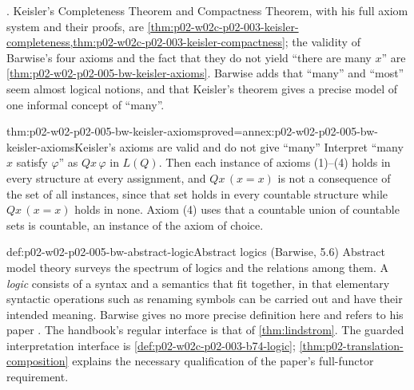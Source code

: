 \cite[ch.~A.1, \S5, pp.~44--45]{Barwise1977FirstOrder}.  Keisler's Completeness Theorem and Compactness Theorem, with his full
axiom system and their proofs, are
\cref{thm:p02-w02c-p02-003-keisler-completeness,thm:p02-w02c-p02-003-keisler-compactness};
the validity of Barwise's four axioms and the fact that they do not
yield ``there are many \(x\)'' are \cref{thm:p02-w02-p02-005-bw-keisler-axioms}.
Barwise adds that ``many'' and ``most'' seem almost logical notions, and
that Keisler's theorem gives a precise model of one informal concept of
``many''.

\begin{hbtheorem}{thm:p02-w02-p02-005-bw-keisler-axioms}{proved=annex:p02-w02-p02-005-bw-keisler-axioms}{Keisler's axioms are valid and do not give ``many''}
Interpret ``many \(x\) satisfy \(\varphi\)'' as \(Qx\,\varphi\) in \(L(Q)\).
Then each instance of axioms (1)--(4) holds in every structure at every
assignment, and \(Qx\,(x=x)\) is not a consequence of the set of all
instances, since that set holds in every countable structure while
\(Qx\,(x=x)\) holds in none.  Axiom (4) uses that a countable union of
countable sets is countable, an instance of the axiom of choice.
\end{hbtheorem}

\begin{hbdefinition}{def:p02-w02-p02-005-bw-abstract-logic}{Abstract logics (Barwise, 5.6)}
Abstract model theory surveys the spectrum of logics and the relations
among them.  A \emph{logic} consists of a syntax and a semantics that fit
together, in that elementary syntactic operations such as renaming symbols
can be carried out and have their intended meaning.  Barwise gives no more
precise definition here and refers to his paper \cite{Barwise1974Axioms}
\cite[ch.~A.1, \S5, 5.6, p.~45]{Barwise1977FirstOrder}.  The handbook's
regular interface is that of \cref{thm:lindstrom}. The guarded
interpretation interface is \cref{def:p02-w02c-p02-003-b74-logic};
\cref{thm:p02-translation-composition} explains the necessary
qualification of the paper's full-functor requirement.
\end{hbdefinition}

